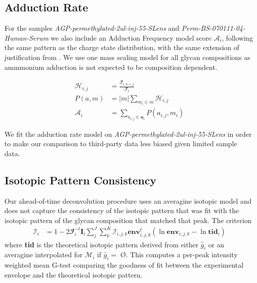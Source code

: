     \subsection{Adduction Rate}
        For the samples \textit{AGP-permethylated-2ul-inj-55-SLens} and \textit{Perm-BS-070111-04-Human-Serum}
        we also include an Adduction Frequency model score $\mathscr{A}_i$, following the same
        pattern as the charge state distribution, with the same extension of justification
        from \cite{Maxwell2012}. We use one mass scaling model for all glycan compositions
        as ammmonium adduction is not expected to be composition dependent.

        \begin{align}
            \mathcal{H}_{i,j} &= \frac{
                \mathbfcal{I}_{i, a=j}}{\mathbfcal{I}_i} \nonumber\\
            P(a, m) &= |m|\sum_{m_i \in m} \mathcal{H}_{i, j} \nonumber\\
            \mathscr{A}_i &= \sum_{a_{i, j} \in \mathbf{a}_i}{P(a_{i, j}, m_i)}
        \end{align}

        We fit the adduction rate model on \textit{AGP-permethylated-2ul-inj-55-SLens} in order
        to make our comparison to third-party data less biased given limited sample data.

    \subsection{Isotopic Pattern Consistency}
        Our ahead-of-time deconvolution procedure uses an averagine isotopic model and does not
        capture the consistency of the isotopic pattern that was fit with the isotopic pattern
        of the glycan composition that matched that peak. The criterion
        \begin{align}
            \mathscr{I}_i &= 1 - 2\mathbfcal{I}_i^{-t}\mathbf{I}_i\sum_j^J{
                \sum_k^K{\mathcal{I}_{i, j, k}
                    \textbf{env}_{i, j, k}^t\left(
                        \ln{\textbf{env}}_{i, j, k} -
                        \ln{\textbf{tid}_{i}}
                    \right)
                }
            }
        \end{align}
        \noindent where \textbf{tid} is the theoretical isotopic pattern derived from either ${\hat g}_i$
        or an averagine interpolated for $\mathcal{M}_i$ if ${\hat g}_i =$ \O. This computes a
        per-peak intensity weighted mean G-test comparing the goodness of fit between the experimental
        envelope and the theoretical isotopic pattern.

